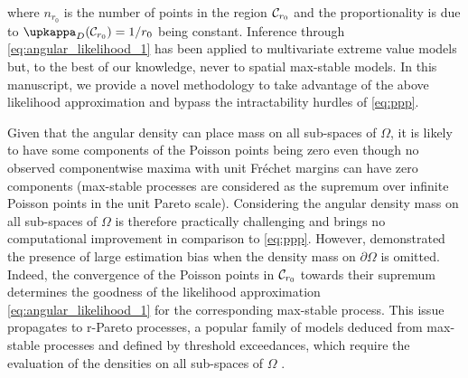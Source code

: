 \documentclass[lineno]{biometrika}
\begin{document}
%
where $n_{r_0}$ is the number of points in the region ${\mathcal C}_{r_0}$ and 
the proportionality is due to $\upkappa_D(\calC_{r_0})=1/r_0$ being constant.
Inference through \eqref{eq:angular_likelihood_1} has been applied to multivariate extreme value models \citep[e.g.,][]{Cooley.etal:2010, Engelke.etal:2015, Beranger.Padoan:2015} but, to the best of our knowledge, never to spatial max-stable models. In this manuscript, we provide a novel methodology to take advantage of the above likelihood approximation and bypass the intractability hurdles of \eqref{eq:ppp}.

Given that the angular density can place mass on 
all sub-spaces of $\Omega$, it is likely to have some components of the Poisson points being zero even though no observed componentwise maxima with unit Fr\'{e}chet margins can have zero components 
(max-stable processes are considered as the supremum over infinite Poisson points in the unit Pareto scale). 
Considering the angular density mass on all sub-spaces of $\Omega$ is therefore practically challenging and brings no computational improvement in comparison to \eqref{eq:ppp}. 
However, \cite{Beranger.etal:2017} demonstrated the presence of large estimation bias when the density mass on $\partial\Omega$ is omitted.
%
Indeed, the convergence of the Poisson points in ${\mathcal C}_{r_0}$ towards their supremum determines the goodness of the likelihood approximation \eqref{eq:angular_likelihood_1} for the corresponding max-stable process. 
This issue propagates to r-Pareto processes, a popular family of models deduced from max-stable processes and defined by threshold exceedances, which require the evaluation of the densities on all sub-spaces of $\Omega$ \citep{Dombry.Ribatet:2015,deFondeville.Davison:2018}.
\end{document}
